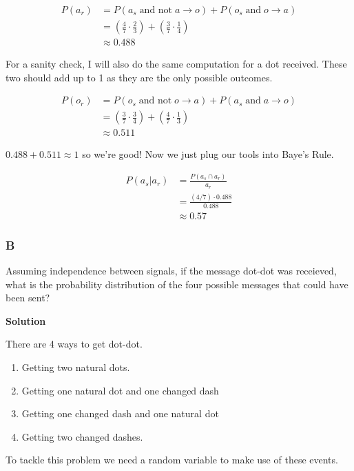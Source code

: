 \begin{align*}
	P(a_r) &= P(a_s \; \text{and not}\; a \rightarrow o) + P(o_s \; \text{and}\; o \rightarrow a) \\
	&= \left( \frac{4}{7} \cdot \frac{2}{3} \right) + \left( \frac{3}{7} \cdot \frac{1}{4} \right) \\
	&\approx 0.488
\end{align*}

For a sanity check, I will also do the same computation for a dot received. These two should add up to 1 as they are the only possible outcomes.

\begin{align*}
	P(o_r) &= P(o_s \; \text{and not}\; o \rightarrow a) + P(a_s \; \text{and}\; a \rightarrow o) \\
	&= \left( \frac{3}{7} \cdot \frac{3}{4} \right) + \left( \frac{4}{7} \cdot \frac{1}{3} \right) \\
	&\approx 0.511
\end{align*}

$0.488 + 0.511 \approx 1$ so we're good! Now we just plug our tools into Baye's Rule.

\begin{align*}
	P(a_s | a_r) &= \frac{P(a_s \cap a_r)}{a_r} \\
	&= \frac{(4/7) \cdot 0.488}{0.488} \\
	&\approx 0.57
\end{align*}

\subsubsection*{B}

Assuming independence between signals, if the message dot-dot was receieved, what is the probability distribution of the four possible messages that could have been sent?

\noindent \textbf{Solution}

There are 4 ways to get dot-dot. 

\begin{enumerate}
	\item Getting two natural dots. 
	\item Getting one natural dot and one changed dash
	\item Getting one changed dash and one natural dot
	\item Getting two changed dashes.
\end{enumerate}

To tackle this problem we need a random variable to make use of these events. 

